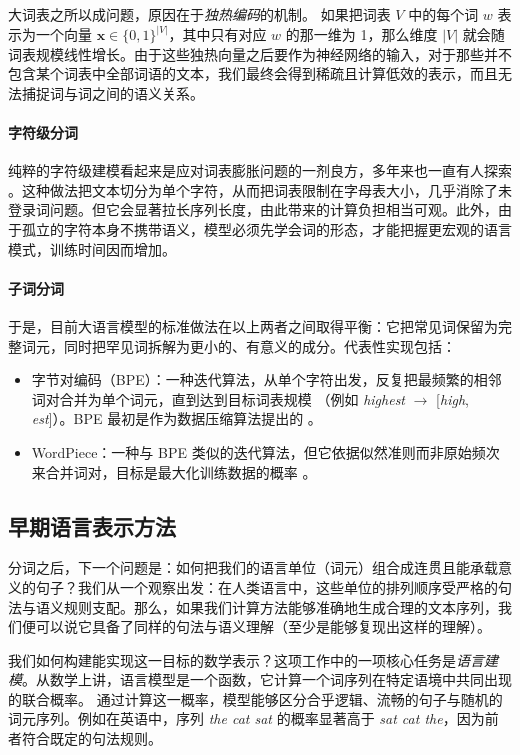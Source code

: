 大词表之所以成问题，原因在于\emph{独热编码}的机制。
如果把词表 $V$ 中的每个词 $w$ 表示为一个向量 $\mathbf{x} \in \{0, 1\}^{|V|}$，其中只有对应 $w$ 的那一维为 1，那么维度 $|V|$ 就会随词表规模线性增长。由于这些独热向量之后要作为神经网络的输入，对于那些并不包含某个词表中全部词语的文本，我们最终会得到稀疏且计算低效的表示，而且无法捕捉词与词之间的语义关系。

\paragraph{字符级分词} 
纯粹的字符级建模看起来是应对词表膨胀问题的一剂良方，多年来也一直有人探索 \citep{mielke2021wordscharactersbriefhistory}。这种做法把文本切分为单个字符，从而把词表限制在字母表大小，几乎消除了未登录词问题。但它会显著拉长序列长度，由此带来的计算负担相当可观。此外，由于孤立的字符本身不携带语义，模型必须先学会词的形态，才能把握更宏观的语言模式，训练时间因而增加。

\paragraph{子词分词} 于是，目前大语言模型的标准做法在以上两者之间取得平衡：它把常见词保留为完整词元，同时把罕见词拆解为更小的、有意义的成分。代表性实现包括：

\begin{itemize}
    \item 字节对编码（BPE）：一种迭代算法，从单个字符出发，反复把最频繁的相邻词对合并为单个词元，直到达到目标词表规模 \citep{sennrich-etal-2016-neural}（例如 \textit{highest} $\rightarrow$ [\textit{high}, \textit{est}]）。BPE 最初是作为数据压缩算法提出的 \citep{gage1994new}。
    \item WordPiece：一种与 BPE 类似的迭代算法，但它依据似然准则而非原始频次来合并词对，目标是最大化训练数据的概率 \citep{wu2016googlesneuralmachinetranslation}。
\end{itemize}

\subsection{早期语言表示方法}
\label{sec:early}
分词之后，下一个问题是：如何把我们的语言单位（词元）组合成连贯且能承载意义的句子？我们从一个观察出发：在人类语言中，这些单位的排列顺序受严格的句法与语义规则支配。那么，如果我们计算方法能够准确地生成合理的文本序列，我们便可以说它具备了同样的句法与语义理解（至少是能够复现出这样的理解）。

我们如何构建能实现这一目标的数学表示？这项工作中的一项核心任务是\emph{语言建模}。从数学上讲，语言模型是一个函数，它计算一个词序列在特定语境中共同出现的联合概率。
通过计算这一概率，模型能够区分合乎逻辑、流畅的句子与随机的词元序列。例如在英语中，序列 \textit{the cat sat} 的概率显著高于 \textit{sat cat the}，因为前者符合既定的句法规则。

